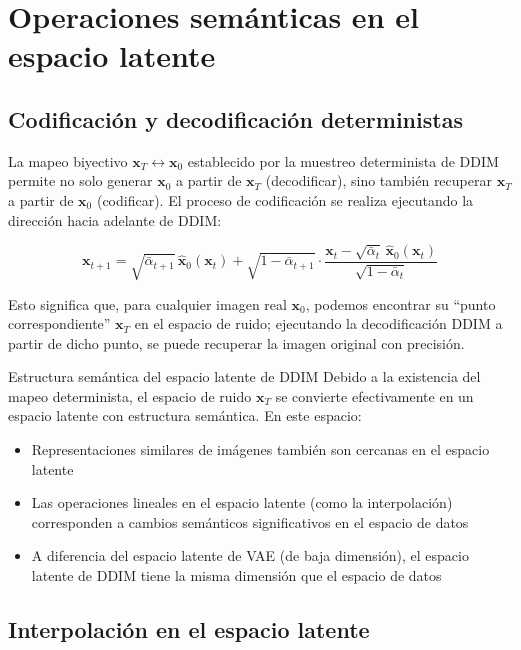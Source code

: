 \section{Operaciones semánticas en el espacio latente}

\subsection{Codificación y decodificación deterministas}

La mapeo biyectivo $\mathbf{x}_T \leftrightarrow \mathbf{x}_0$ establecido por la muestreo determinista de DDIM permite no solo generar $\mathbf{x}_0$ a partir de $\mathbf{x}_T$ (decodificar), sino también recuperar $\mathbf{x}_T$ a partir de $\mathbf{x}_0$ (codificar). El proceso de codificación se realiza ejecutando la dirección hacia adelante de DDIM:

$$
\mathbf{x}_{t+1} = \sqrt{\bar{\alpha}_{t+1}}\,\hat{\mathbf{x}}_0(\mathbf{x}_t) + \sqrt{1-\bar{\alpha}_{t+1}}\cdot\frac{\mathbf{x}_t - \sqrt{\bar{\alpha}_t}\,\hat{\mathbf{x}}_0(\mathbf{x}_t)}{\sqrt{1-\bar{\alpha}_t}}
$$

Esto significa que, para cualquier imagen real $\mathbf{x}_0$, podemos encontrar su ``punto correspondiente'' $\mathbf{x}_T$ en el espacio de ruido; ejecutando la decodificación DDIM a partir de dicho punto, se puede recuperar la imagen original con precisión.

\begin{importantbox}{Estructura semántica del espacio latente de DDIM}
Debido a la existencia del mapeo determinista, el espacio de ruido $\mathbf{x}_T$ se convierte efectivamente en un espacio latente con estructura semántica. En este espacio:
\begin{itemize}
    \item Representaciones similares de imágenes también son cercanas en el espacio latente
    \item Las operaciones lineales en el espacio latente (como la interpolación) corresponden a cambios semánticos significativos en el espacio de datos
    \item A diferencia del espacio latente de VAE (de baja dimensión), el espacio latente de DDIM tiene la misma dimensión que el espacio de datos
\end{itemize}
\end{importantbox}

\subsection{Interpolación en el espacio latente}

